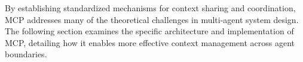 By establishing standardized mechanisms for context sharing and coordination, MCP addresses many of the theoretical challenges in multi-agent system design. The following section examines the specific architecture and implementation of MCP, detailing how it enables more effective context management across agent boundaries.\\ \newline
